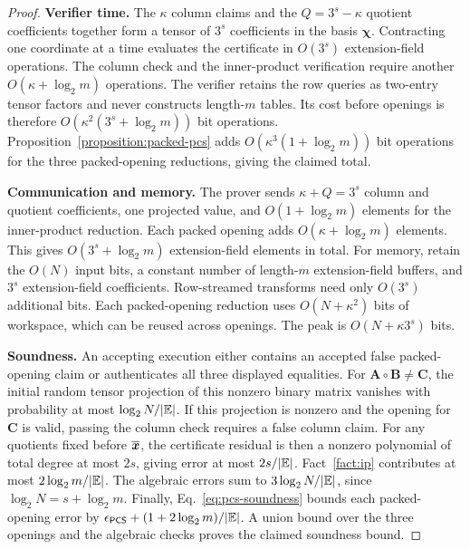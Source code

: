 \begin{proof}
\smallskip\noindent\textbf{Verifier time.}
The \(\kappa\) column claims and the \(Q=3^s-\kappa\)
quotient coefficients together form a tensor of \(3^s\)
coefficients in the basis \(\bm\chi\).
Contracting one coordinate at a time evaluates the certificate
in \(O(3^s)\) extension-field operations.
The column check and the inner-product verification require
another \(O(\kappa+\log_2m)\) operations.
The verifier retains the row queries as two-entry tensor factors
and never constructs length-\(m\) tables.
Its cost before openings is therefore
\(O(\kappa^2(3^s+\log_2m))\) bit operations.
Proposition~\ref{proposition:packed-pcs} adds
\(O(\kappa^3(1+\log_2m))\) bit operations for the three
packed-opening reductions, giving the claimed total.

\smallskip\noindent\textbf{Communication and memory.}
The prover sends \(\kappa+Q=3^s\) column and quotient
coefficients, one projected value, and
\(O(1+\log_2m)\) elements for the inner-product reduction.
Each packed opening adds \(O(\kappa+\log_2m)\) elements.
This gives \(O(3^s+\log_2m)\) extension-field elements in total.
For memory, retain the \(O(N)\) input bits, a constant number
of length-\(m\) extension-field buffers, and \(3^s\)
extension-field coefficients. Row-streamed transforms need
only \(O(3^s)\) additional bits.
Each packed-opening reduction uses \(O(N+\kappa^2)\) bits
of workspace, which can be reused across openings.
The peak is \(O(N+\kappa3^s)\) bits.

\smallskip\noindent\textbf{Soundness.}
An accepting execution either contains an accepted false
packed-opening claim or authenticates all three displayed equalities.
For \(\bm A\circ\bm B\neq\bm C\), the initial random
tensor projection of this nonzero binary matrix vanishes with
probability at most \(\log_2N/|\mathbb{E}|\).
If this projection is nonzero and the opening for \(\bm C\)
is valid, passing the column check requires a false column claim.
For any quotients fixed before \(\overline{\bm x}\),
the certificate residual is then a nonzero polynomial of total
degree at most \(2s\), giving error at most
\(2s/|\mathbb{E}|\).
Fact~\ref{fact:ip} contributes at most
\(2\log_2m/|\mathbb{E}|\).
The algebraic errors sum to
\(3\log_2N/|\mathbb{E}|\), since
\(\log_2N=s+\log_2m\).
Finally, Eq.~\eqref{eq:pcs-soundness} bounds each packed-opening
error by
\(\epsilon_{\mathsf{PCS}}+(1+2\log_2m)/|\mathbb{E}|\).
A union bound over the three openings and the algebraic checks
proves the claimed soundness bound.
\end{proof}

